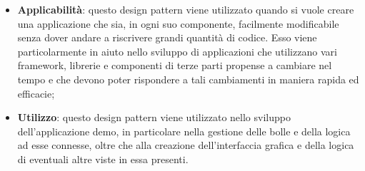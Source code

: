 \begin{itemize}
	\item \textbf{Applicabilità}: questo design pattern viene utilizzato quando si vuole creare una applicazione che sia, in ogni suo componente, facilmente modificabile senza dover andare a riscrivere grandi quantità di codice. Esso viene particolarmente in aiuto nello sviluppo di applicazioni che utilizzano vari framework, librerie e componenti di terze parti propense a cambiare nel tempo e che devono poter rispondere a tali cambiamenti in maniera rapida ed efficacie;
	\item \textbf{Utilizzo}: questo design pattern viene utilizzato nello sviluppo dell'applicazione demo, in particolare nella gestione delle bolle e della logica ad esse connesse, oltre che alla creazione dell'interfaccia grafica e della logica di eventuali altre viste in essa presenti.
\end{itemize}
 